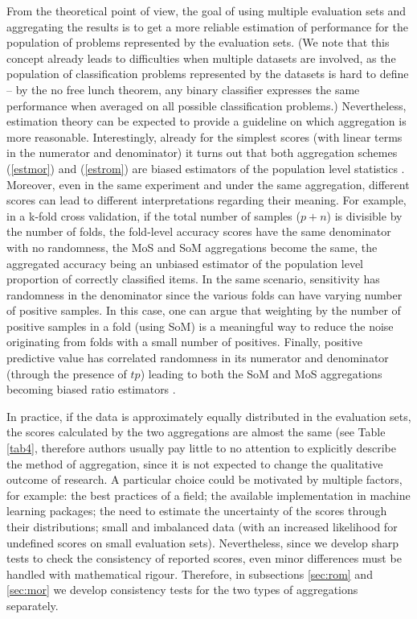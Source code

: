 \documentclass[5p, final]{elsarticle}
\begin{document}
From the theoretical point of view, the goal of using multiple evaluation sets and aggregating the results is to get a more reliable estimation of performance for the population of problems represented by the evaluation sets. (We note that this concept already leads to difficulties when multiple datasets are involved, as the population of classification problems represented by the datasets is hard to define -- by the no free lunch theorem, any binary classifier expresses the same performance when averaged on all possible classification problems.) Nevertheless, estimation theory can be expected to provide a guideline on which aggregation is more reasonable. Interestingly, already for the simplest scores (with linear terms in the numerator and denominator) it turns out that both aggregation schemes (\ref{estmor}) and (\ref{estrom}) are biased estimators of the population level statistics \cite{rommor2}. Moreover, even in the same experiment and under the same aggregation, different scores can lead to different interpretations regarding their meaning. For example, in a k-fold cross validation, if the total number of samples ($p + n$) is divisible by the number of folds, the fold-level accuracy scores have the same denominator with no randomness, the MoS and SoM aggregations become the same, the aggregated accuracy being an unbiased estimator of the population level proportion of correctly classified items. In the same scenario, sensitivity has randomness in the denominator since the various folds can have varying number of positive samples. In this case, one can argue that weighting by the number of positive samples in a fold (using SoM) is a meaningful way to reduce the noise originating from folds with a small number of positives. Finally, positive predictive value has correlated randomness in its numerator and denominator (through the presence of $tp$) leading to both the SoM and MoS aggregations becoming biased ratio estimators \cite{rommor2}.

In practice, if the data is approximately equally distributed in the evaluation sets, the scores calculated by the two aggregations are almost the same (see Table \ref{tab4}, therefore authors usually pay little to no attention to explicitly describe the method of aggregation, since it is not expected to change the qualitative outcome of research. A particular choice could be motivated by multiple factors, for example: the best practices of a field; the available implementation in machine learning packages;
the need to estimate the uncertainty of the scores through their distributions; small and imbalanced data (with an increased likelihood for undefined scores on small evaluation sets).
Nevertheless, since we develop sharp tests to check the consistency of reported scores, even minor differences must be handled with mathematical rigour. Therefore, in subsections \ref{sec:rom} and \ref{sec:mor} we develop consistency tests for the two types of aggregations separately.
\end{document}
